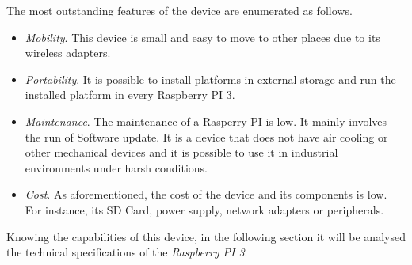 The most outstanding features of the device are enumerated as follows.

\begin{itemize}

\item \textit{Mobility}. This device is small and easy to move to other places due to its wireless adapters.

\item \textit{Portability}. It is possible to install platforms in external storage and run the installed platform in every Raspberry PI 3.

\item \textit{Maintenance}. The maintenance of a Rasperry PI is low. It mainly involves the run of Software update. It is a device that does not have air cooling or other mechanical devices and it is possible to use it in industrial environments under harsh conditions.

\item \textit{Cost}. As aforementioned, the cost of the device and its components is low. For instance, its SD Card, power supply, network adapters or peripherals.

\end{itemize}

Knowing the capabilities of this device, in the following section it will be analysed the technical specifications of the \textit{Raspberry PI 3}.

